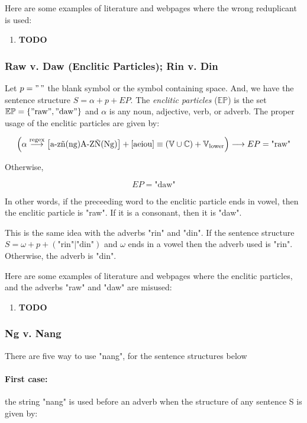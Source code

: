 \begin{example}
      Here are some examples of literature and webpages where the wrong reduplicant is
      used:
\end{example}
\begin{enumerate}
      \item \textbf{TODO}
\end{enumerate}

\subsubsection{Raw v. Daw (Enclitic Particles); Rin v. Din}

Let \(p = "\,"\) the blank symbol or the symbol containing space. And, we have the
sentence structure \(S = \alpha + p + EP\). The \textit{enclitic particles}
(\(\mathbb{EP}\)) is the set \(\mathbb{EP} = \{"\text{raw}", "\text{daw}"\}\) and
\(\alpha\) is any noun, adjective, verb, or adverb. The proper usage of the enclitic
particles are given by:

\[
      \left(\alpha \overset{\text{regex}}{\longrightarrow} \left[\text{a-zñ(ng)A-ZÑ(Ng)}\right]+\left[\text{aeiou}\right] \equiv (\mathbb{V}\cup\mathbb{C}) + \mathbb{V}_\text{lower}\right)
      \longrightarrow EP = \text{"raw"}
\]

Otherwise,

\[
      EP = \text{"daw"}
\]

In other words, if the preceeding word to the enclitic particle ends in vowel,
then the enclitic particle is "raw". If it is a consonant, then it is "daw".

This is the same idea with the adverbs "rin" and "din". If the sentence structure
\(S = \omega + p + (\text{"rin"}|\text{"din"})\) and \(\omega\) ends in a vowel
then the adverb used is "rin". Otherwise, the adverb is "din".

Here are some examples of literature and webpages where the enclitic particles,
and the adverbs "raw" and "daw" are misused:
\begin{enumerate}
      \item \textbf{TODO}
\end{enumerate}

\subsubsection{Ng v. Nang}

There are five way to use "nang", for the sentence structures below

\paragraph{First case:} the string "nang" is used before an adverb when the
structure of any sentence S is given by:

